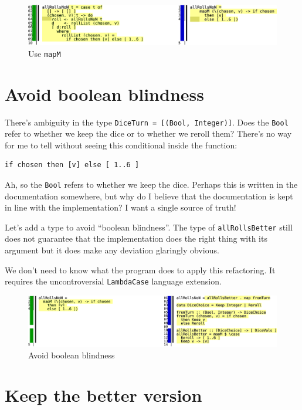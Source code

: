 \begin{figure}[htbp]
 \centering
 \includegraphics[width=\linewidth]{./pics/diff16.pdf}
 \caption{Use \texttt{mapM}}
 \label{fig:diff16}
\end{figure}


\section{Avoid boolean blindness}


There's ambiguity in the type \texttt{DiceTurn = [(Bool, Integer)]}. Does the \texttt{Bool} refer to whether we keep the dice or to whether we reroll them? There's no way for me to tell without seeing this conditional inside the function:

\begin{verbatim}
if chosen then [v] else [ 1..6 ]
\end{verbatim}
Ah, so the \texttt{Bool} refers to whether we keep the dice. Perhaps this is written in the documentation somewhere, but why do I believe that the documentation is kept in line with the implementation? I want a single source of truth!

Let's add a type to avoid ``boolean blindness''. The type of \texttt{allRollsBetter} still does not guarantee that the implementation does the right thing with its argument but it does make any deviation glaringly obvious.

We don't need to know what the program does to apply this refactoring. It requires the uncontroversial \texttt{LambdaCase} language extension.

\begin{figure}[htbp]
 \centering
 \includegraphics[width=\linewidth]{./pics/diff17.pdf}
 \caption{Avoid boolean blindness}
 \label{fig:diff17}
\end{figure}



\section{Keep the better version}


